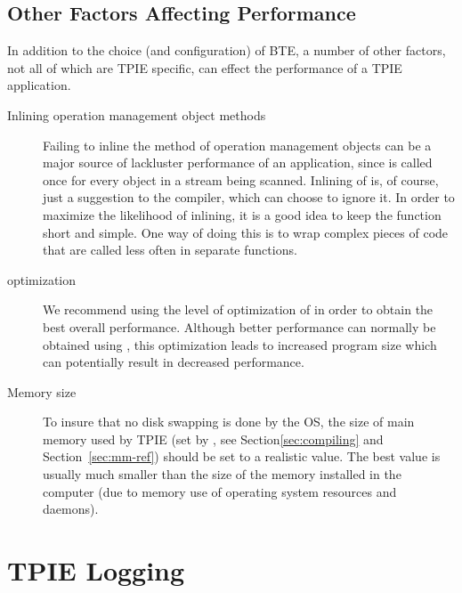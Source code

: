 \subsection{Other Factors Affecting Performance}

In addition to the choice (and configuration) of BTE, a number of other
factors, not all of which are TPIE specific, can effect the performance of
a TPIE application.

\begin{description}
    \item[Inlining operation management object methods]
    Failing to inline the  method of
    operation management objects can be a major source of
    lackluster performance of an application, since
     is called once for every object in a
    stream being scanned. Inlining of  is,
    of course, just a suggestion to the compiler, which can
    choose to ignore it. In order to maximize the likelihood
    of inlining, it is a good idea to keep the function
    short and simple. One way of doing this is to wrap
    complex pieces of code that are called less often in
    separate functions.
    \item[ optimization] We recommend using the
     level of optimization of  in
    order to obtain the best overall performance. Although
    better performance can normally be obtained using
    , this optimization leads to increased
    program size which can potentially result in decreased
    performance.
    \item[Memory size] To insure that no disk swapping is
    done by the OS, the size of main memory used by TPIE
    (set by , see
    Section\ref{sec:compiling} and Section~\ref{sec:mm-ref})
    should be set to a realistic value. The best value is
    usually much smaller than the size of the memory
    installed in the computer (due to memory use of
    operating system resources and daemons).
\end{description}



\section{TPIE Logging}

